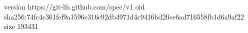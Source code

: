 version https://git-lfs.github.com/spec/v1
oid sha256:74fc4c361fef9a1596e316c92db4971d4c9416bd20ce6ad716558fb1d6a9af22
size 193431
